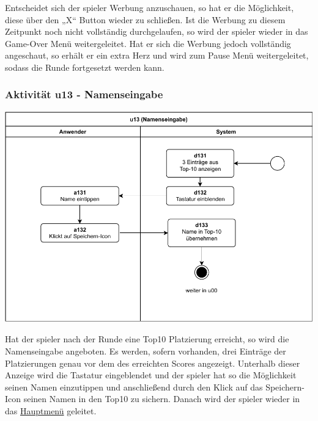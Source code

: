 Entscheidet sich der \gls{spieler} Werbung anzuschauen, so hat er die Möglichkeit, diese über den „X“ Button wieder zu schließen. Ist die Werbung zu diesem Zeitpunkt noch nicht vollständig durchgelaufen, so wird der \gls{spieler} wieder in das Game-Over Menü weitergeleitet. Hat er sich die Werbung jedoch vollständig angeschaut, so erhält er ein extra Herz und wird zum Pause Menü weitergeleitet, sodass die Runde fortgesetzt werden kann.

\clearpage

\subsubsection{Aktivität u13 - Namenseingabe}

\vspace*{1cm}

\includegraphics[width=\linewidth]{diagramme/pdf/UML-Activity-u13.pdf}
\label{fig:dia:highscore}
\vspace*{0.5cm}

Hat der \gls{spieler} nach der Runde eine \gls{Top10} Platzierung erreicht, so wird die Namenseingabe angeboten. Es werden, sofern vorhanden, drei Einträge der Platzierungen genau vor dem des erreichten Scores angezeigt. Unterhalb dieser Anzeige wird die Tastatur
eingeblendet und der \gls{spieler} hat so die Möglichkeit seinen Namen einzutippen und anschließend durch den Klick auf das Speichern-Icon seinen Namen in den \gls{Top10} zu sichern. Danach wird der \gls{spieler} wieder in das \hyperref[fig:dia:mainMenu]{Hauptmenü} geleitet.

\clearpage

